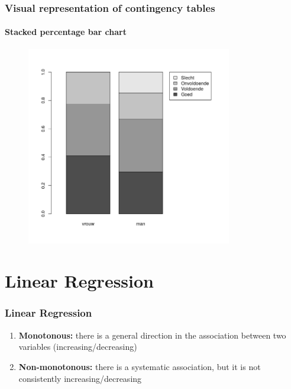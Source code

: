 \documentclass{beamer}
\begin{document}
\begin{frame}
  \frametitle{Visual representation of contingency tables}
  \framesubtitle{Stacked percentage bar chart}
  
  \begin{figure}
    \centering
    \includegraphics[width=0.80\textwidth]{img/2var-rependiagram-waardering-mv}
  \end{figure}

\end{frame}

\section{Linear Regression}
\sectionframelogo{}

\begin{frame}
  \frametitle{Linear Regression}
  


  \begin{enumerate}
    \item \textbf{Monotonous:} there is a general direction in the association between two variables (increasing/decreasing)
    \item \textbf{Non-monotonous:} there is a systematic association, but it is not consistently increasing/decreasing
  \end{enumerate}
\end{frame}
\end{document}
